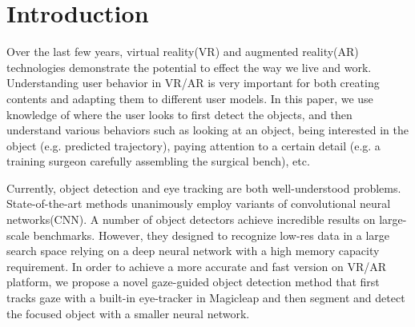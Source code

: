 \vspace{-3em}
\section{Introduction}

Over the last few years, virtual reality(VR) and augmented reality(AR) technologies demonstrate the potential to effect the way we live and work. Understanding user behavior in VR/AR is very important for both creating contents and adapting them to different user models. In this paper, we use knowledge of where the user looks to first detect the objects, and then understand various behaviors such as looking at an object, being interested in the object (e.g. predicted trajectory), paying attention to a certain detail (e.g. a training surgeon carefully assembling the surgical bench), etc. 

Currently, object detection and eye tracking are both well-understood problems. State-of-the-art methods unanimously employ variants of convolutional neural networks(CNN). A number of object detectors \cite{redmon2016you, liu2016ssd, lin2017focal, girshick2014rich, girshick2015fast, ren2015faster, he2017mask} achieve incredible results on large-scale benchmarks. However, they designed to recognize low-res data in a large search space relying on a deep neural network with a high memory capacity requirement. In order to achieve a more accurate and fast version on VR/AR platform, we propose a novel gaze-guided object detection method that first tracks gaze with a built-in eye-tracker in Magicleap and then segment and detect the focused object with a smaller neural network.  

